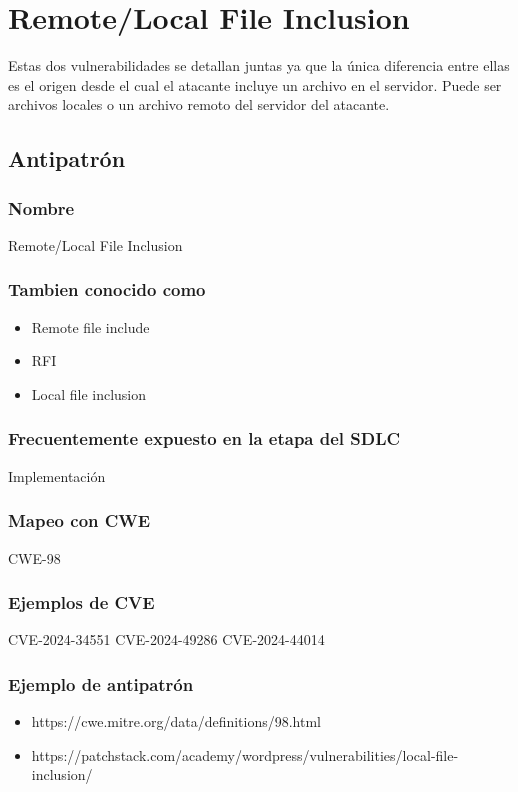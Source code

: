 \chapter{Remote/Local File Inclusion}

Estas dos vulnerabilidades se detallan juntas ya que la única diferencia entre ellas es el origen desde el cual el atacante incluye un archivo en el servidor. Puede ser archivos locales o un archivo remoto del servidor del atacante. 

\section{Antipatrón}
\subsection*{Nombre}
Remote/Local File Inclusion
\subsection*{Tambien conocido como}
\begin{itemize}
    \item Remote file include
    \item RFI
    \item Local file inclusion
\end{itemize}
\subsection*{Frecuentemente expuesto en la etapa del SDLC}
Implementación
\subsection*{Mapeo con CWE}
CWE-98
\subsection*{Ejemplos de CVE}
CVE-2024-34551 
CVE-2024-49286 
CVE-2024-44014 
\subsection*{Ejemplo de antipatrón}

\begin{itemize}
    \item https://cwe.mitre.org/data/definitions/98.html
    \item https://patchstack.com/academy/wordpress/vulnerabilities/local-file-inclusion/
\end{itemize}


